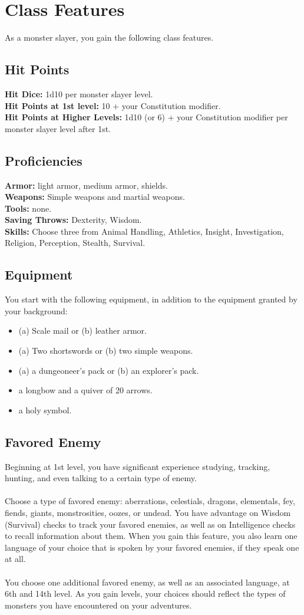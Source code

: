 \documentclass[11pt,a4paper,twocolumn, sans]{article}
\newcommand{\proficiency}[2]
{
	\textbf{#1:} #2. \\
}
\begin{document}
	\section*{Class Features}
	As a monster slayer, you gain the following class features.
	
	\subsection*{Hit Points}
	\proficiency{Hit Dice}{1d10 per monster slayer level}
	\proficiency{Hit Points at 1st level}{10 + your Constitution modifier}
	\proficiency{Hit Points at Higher Levels}{1d10 (or 6) + your Constitution modifier per monster slayer level after 1st}
	
	\subsection*{Proficiencies}
	\proficiency{Armor}{light armor, medium armor, shields}
	\proficiency{Weapons}{Simple weapons and martial weapons}
	\proficiency{Tools}{none}
	\proficiency{Saving Throws}{Dexterity, Wisdom}
	\proficiency{Skills}{Choose three from Animal Handling, Athletics, Insight, Investigation, Religion, Perception, Stealth, Survival}
	
	\subsection*{Equipment}
	You start with the following equipment, in
	addition to the equipment granted by your
	background:
	\begin{itemize}
		\item (a) Scale mail or (b) leather armor.
		\item (a) Two shortswords or (b) two simple weapons.
		\item (a) a dungeoneer's pack or (b) an explorer's pack.
		\item a longbow and a quiver of 20 arrows.
		\item a holy symbol.
	\end{itemize}
	\subsection*{Favored Enemy}
	Beginning at 1st level, you have significant experience studying, tracking, hunting, and even talking to a certain type of enemy. \\ \\
	Choose a type of favored enemy: aberrations, celestials, dragons, elementals, fey, fiends, giants, monstrosities, oozes, or undead.
	You have advantage on Wisdom (Survival) checks to track your favored enemies, as well as on Intelligence checks to recall information about them.
	When you gain this feature, you also learn one language of your choice that is spoken by your favored enemies, if they speak one at all. \\ \\
	You choose one additional favored enemy, as well as an associated language, at 6th and 14th level. As you gain levels, your choices should reflect the types of monsters you have encountered on your adventures.
	
\end{document}

